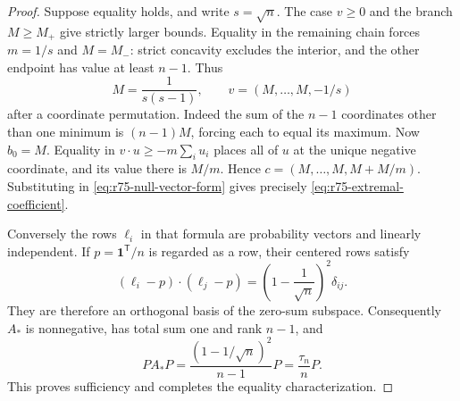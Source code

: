 \begin{proof}
Suppose equality holds, and write $s=\sqrt n$.
The case $v\ge0$ and the branch $M\ge M_+$ give strictly larger
bounds. Equality in the remaining chain forces
$m=1/s$ and $M=M_-$: strict concavity excludes the interior, and
the other endpoint has value at least $n-1$. Thus
\[
 M=\frac1{s(s-1)},\qquad
 v=(M,\ldots,M,-1/s)
\]
after a coordinate permutation. Indeed the sum of the $n-1$
coordinates other than one minimum is $(n-1)M$, forcing each
to equal its maximum. Now $b_0=M$. Equality in
$v\cdot u\ge-m\sum_i u_i$ places all of $u$ at the unique
negative coordinate, and its value there is $M/m$.
Hence $c=(M,\ldots,M,M+M/m)$. Substituting in
\eqref{eq:r75-null-vector-form} gives precisely
\eqref{eq:r75-extremal-coefficient}.

Conversely the rows $\ell_i$ in that formula are probability
vectors and linearly independent. If $p=\mathbf1^{\mathsf T}/n$
is regarded as a row, their centered rows satisfy
\[
 (\ell_i-p)\cdot(\ell_j-p)
    =\left(1-\frac1{\sqrt n}\right)^2\delta_{ij}.
\]
They are therefore an orthogonal basis of the zero-sum subspace.
Consequently $A_*$ is nonnegative, has total sum one and rank
$n-1$, and
\[
 PA_*P=\frac{(1-1/\sqrt n)^2}{n-1}P
       =\frac{\tau_n}{n}P.
\]
This proves sufficiency and completes the equality characterization.
\end{proof}

